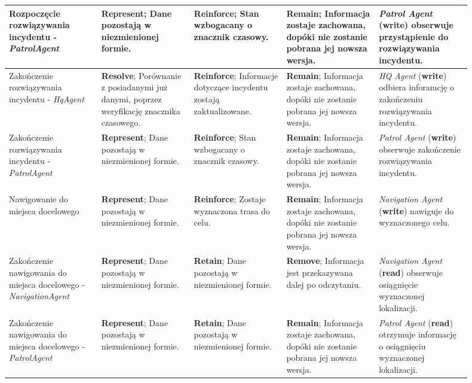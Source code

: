 \begin{landscape}
\begin{longtable}{|p{0.18\linewidth}|p{0.18\linewidth}|p{0.18\linewidth}|p{0.18\linewidth}|p{0.18\linewidth}|}
     Rozpoczęcie rozwiązywania incydentu - \emph{PatrolAgent} & \textbf{Represent}; Dane pozostają w niezmienionej formie. & \textbf{Reinforce}; Stan wzbogacany o znacznik czasowy. & \textbf{Remain}; Informacja zostaje zachowana, dopóki nie zostanie pobrana jej nowsza wersja.  & \emph{Patrol Agent} (\textbf{write}) obserwuje przystąpienie do rozwiązywania incydentu. \\
     \hline

     Zakończenie rozwiązywania incydentu - \emph{HqAgent} & \textbf{Resolve}; Porównanie z posiadanymi już danymi, poprzez weryfikację znacznika czasowego. & \textbf{Reinforce}; Informacje dotyczące incydentu zostają zaktualizowane. & \textbf{Remain}; Informacja zostaje zachowana, dopóki nie zostanie pobrana jej nowsza wersja.  & \emph{HQ Agent} (\textbf{write}) odbiera inforamcję o zakończeniu rozwiązywania incydentu. \\
     \hline

     Zakończenie rozwiązywania incydentu - \emph{PatrolAgent} & \textbf{Represent}; Dane pozostają w niezmienionej formie. & \textbf{Reinforce}; Stan wzbogacany o znacznik czasowy. & \textbf{Remain}; Informacja zostaje zachowana, dopóki nie zostanie pobrana jej nowsza wersja.  & \emph{Patrol Agent} (\textbf{write}) obserwuje zakończenie rozwiązywania incydentu. \\
     \hline

     Nawigowanie do miejsca docelowego & \textbf{Represent}; Dane pozostają w niezmienionej formie. & \textbf{Reinforce}; Zostaje wyznaczona trasa do celu. & \textbf{Remain}; Informacja zostaje zachowana, dopóki nie zostanie pobrana jej nowsza wersja.  & \emph{Navigation Agent} (\textbf{write}) nawiguje do wyznaczonego celu. \\
     \hline

     Zakończenie nawigowania do miejsca docelowego - \emph{NavigationAgent} & \textbf{Represent}; Dane pozostają w niezmienionej formie. & \textbf{Retain}; Dane pozostają w niezmienionej formie. & \textbf{Remove}; Informacja jest przekazywana dalej po odczytaniu.  & \emph{Navigation Agent} (\textbf{read}) obserwuje osiągnięcie wyznaczonej lokalizacji. \\
     \hline

     Zakończenie nawigowania do miejsca docelowego - \emph{PatrolAgent} & \textbf{Represent}; Dane pozostają w niezmienionej formie. & \textbf{Retain}; Dane pozostają w niezmienionej formie. & \textbf{Remain}; Informacja zostaje zachowana, dopóki nie zostanie pobrana jej nowsza wersja.  & \emph{Patrol Agent} (\textbf{read}) otrzymuje informację o osiągnięciu wyznaczonej lokalizacji. \\
     \hline


\end{longtable}
\end{landscape}
